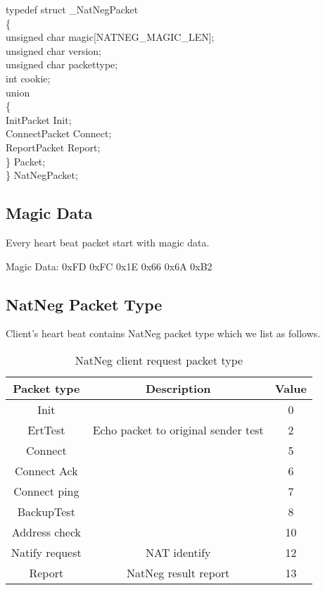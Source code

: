 \documentclass[oneside,titlepage,a4paper]{Definition/retrospy} %
\begin{document}
\begin{mybox}
	typedef struct \_NatNegPacket \\
	\{\\
	unsigned char magic[NATNEG\_MAGIC\_LEN];\\
	unsigned char version;\\
	unsigned char packettype;\\
	int cookie;	\\
	
	union\\
	\{\\
	InitPacket Init;\\
	ConnectPacket Connect;\\
	ReportPacket Report;\\
	\} Packet;\\
	
	\} NatNegPacket;
\end{mybox}

\subsection{Magic Data}
Every heart beat packet start with magic data.
\begin{mybox}
	Magic Data: 0xFD 0xFC 0x1E 0x66 0x6A 0xB2
\end{mybox}

\subsection{NatNeg Packet Type}
Client's heart beat contains NatNeg packet type which we list as follows.

\begin{table}[H]
	\centering
	\begin{tabular}{|c|c|c|}
		\hline
		\textbf{Packet type} &\textbf{Description}&\textbf{Value}\\\hline
		Init && 0\\\hline
		ErtTest&Echo packet to original sender test&2\\\hline
		Connect&&5\\\hline
		Connect Ack&&6\\\hline
		Connect ping&& 7\\\hline
		BackupTest&&8\\\hline
		Address check&& 10\\\hline
		Natify request&NAT identify&12\\\hline
		Report &NatNeg result report& 13\\\hline
	\end{tabular}
	\caption{NatNeg client request packet type}
	\label{NatNeg client request packet type}
\end{table}
\end{document}
